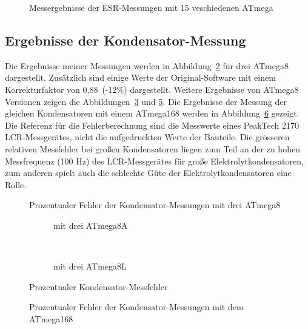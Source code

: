 \begin{figure}[H]
\centering

\caption{Messergebnisse der ESR-Messungen mit 15 veschiedenen ATmega}
\label{fig:Cesr}
\end{figure}


\subsection{Ergebnisse der Kondensator-Messung}
Die Ergebnisse meiner Messungen werden in Abbildung~\ref{fig:mega8cap} für drei ATmega8 dargestellt.
Zusätzlich sind einige Werte der Original-Software mit einem Korrekturfaktor
von 0,88~(-12\%) dargestellt.
Weitere Ergebnisse von ATmega8 Versionen zeigen die Abbildungen~\ref{fig:mega8Acap} und \ref{fig:mega8Lcap}.
Die Ergebnisse der Messung der gleichen Kondensatoren mit einem ATmega168 werden in Abbildung~\ref{fig:mega168cap} gezeigt.
Die Referenz für die Fehlerberechnung sind die Messwerte eines PeakTech 2170 LCR-Messgerätes, 
 nicht die aufgedruckten Werte der Bauteile.
Die grösseren relativen Messfehler bei großen Kondensatoren liegen zum Teil an der zu hohen Messfrequenz (100 Hz) des
LCR-Messgerätes für große Elektrolytkondensatoren, zum anderen spielt auch die schlechte Güte der
Elektrolytkondensatoren eine Rolle.

\begin{figure}[H]
\centering

\caption{Prozentualer Fehler der Kondensator-Messungen mit drei ATmega8}
\label{fig:mega8cap}
\end{figure}

\begin{figure}[H]
  \begin{subfigure}[b]{9cm}
    \centering
    \resizebox{9cm}{!}{}
    \caption{mit drei ATmega8A}
    \label{fig:mega8Acap}
  \end{subfigure}
  ~
  \begin{subfigure}[b]{9cm}
    \centering
    \resizebox{9cm}{!}{}
    \caption{mit drei ATmega8L}
    \label{fig:mega8Lcap}
  \end{subfigure}
  \caption{Prozentualer Kondensator-Messfehler}
\end{figure}

\begin{figure}[H]
\centering

\caption{Prozentualer Fehler der Kondensator-Messungen mit dem ATmega168}
\label{fig:mega168cap}
\end{figure}

